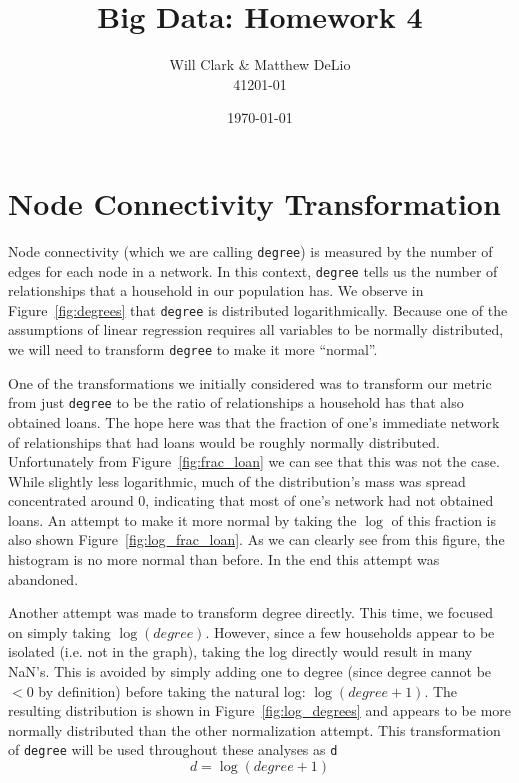 \documentclass[11pt, fleqn]{article}
\begin{document}
\title{Big Data: Homework 4}
\author{Will Clark \& Matthew DeLio \\ 41201-01}
\date{\today}
\maketitle

\section{Node Connectivity Transformation}

Node connectivity (which we are calling \texttt{degree}) is measured by the number of edges for each node in a network. In this context, \texttt{degree} tells us the number of relationships that a household in our population has. We observe in Figure~\ref{fig:degrees} that \texttt{degree} is distributed logarithmically.  Because one of the assumptions of linear regression requires all variables to be normally distributed, we will need to transform \texttt{degree} to make it more ``normal''.

One of the transformations we initially considered was to transform our metric from just \texttt{degree} to be the ratio of relationships a household has that also obtained loans.  The hope here was that the fraction of one's immediate network of relationships that had loans would be roughly normally distributed.  Unfortunately from Figure~\ref{fig:frac_loan} we can see that this was not the case.  While slightly less logarithmic, much of the distribution's mass was spread concentrated around 0, indicating that most of one's network had not obtained loans.  An attempt to make it more normal by taking the $\log$ of this fraction is also shown Figure~\ref{fig:log_frac_loan}.  As we can clearly see from this figure, the histogram is no more normal than before.  In the end this attempt was abandoned.

Another attempt was made to transform degree directly.  This time, we focused on simply taking $\log(degree)$.  However, since a few households appear to be isolated (i.e. not in the graph), taking the log directly would result in many NaN's.  This is avoided by simply adding one to degree (since degree cannot be $<0$ by definition) before taking the natural log: $\log(degree+1)$.  The resulting distribution is shown in Figure~\ref{fig:log_degrees} and appears to be more normally distributed than the other normalization attempt.  This transformation of \texttt{degree} will be used throughout these analyses as \texttt{d}
\begin{equation}
d = \log(degree+1)
\end{equation}
\end{document}
